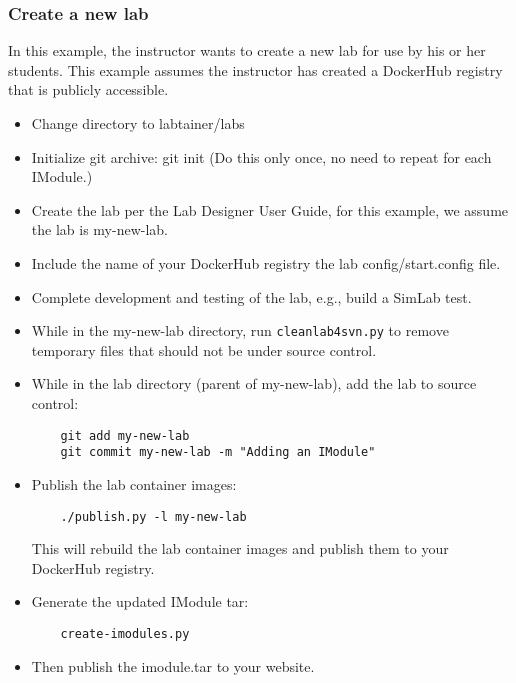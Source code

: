 \documentclass[12pt]{article}
\begin{document}
\subsubsection{Create a new lab}
In this example, the instructor wants to create a new lab for use by his or her students.
This example assumes the instructor has created a DockerHub registry that is publicly accessible.
\begin{itemize}
\item Change directory to labtainer/labs
\item Initialize git archive: git init  (Do this only once, no need to repeat for each IModule.)  
\item Create the lab per the Lab Designer User Guide, for this example, we assume the lab is my-new-lab.
\item Include the name of your DockerHub registry the lab config/start.config file.
\item Complete development and testing of the lab, e.g., build a SimLab test.
\item While in the my-new-lab directory, run {\tt cleanlab4svn.py} to remove temporary files that should not be under source control.
\item While in the lab directory (parent of my-new-lab), add the lab to source control:
\begin{verbatim}
    git add my-new-lab
    git commit my-new-lab -m "Adding an IModule"
\end{verbatim}
\item Publish the lab container images: 
\begin{verbatim}
    ./publish.py -l my-new-lab
\end{verbatim}
\noindent This will rebuild the lab container images and publish them to your DockerHub registry.
\item Generate the updated IModule tar:
\begin{verbatim}
    create-imodules.py
\end{verbatim}
\item Then publish the imodule.tar to your website.
\end{itemize}
\end{document}
